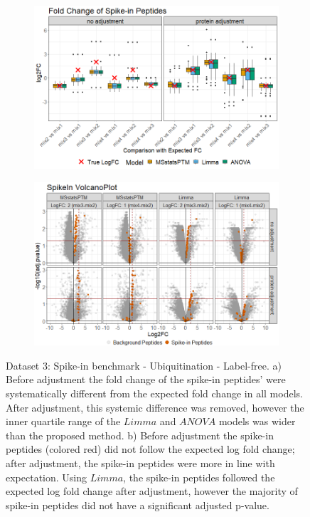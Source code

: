\documentclass[mcp]{article}
\numberwithin{table}{section}
\begin{document}
\begin{figure}[ht]
\centering
\begin{subfigure}[c]{0.825\linewidth}
\includegraphics[width=1\textwidth]{images/spike_in_fc.png}
\caption{}
\label{fig:spikein_boxplot}
\end{subfigure}
\begin{subfigure}[c]{0.825\linewidth}
\includegraphics[width=1\textwidth]{images/spike_in_volcano.png}
\caption{}
\label{fig:spikein_prop_volcano}
\end{subfigure}
\caption{Dataset 3: Spike-in benchmark - Ubiquitination - Label-free. a) Before adjustment the fold change of the spike-in peptides' were systematically different from the expected fold change in all models. After adjustment, this systemic difference was removed, however the inner quartile range of the $Limma$ and $ANOVA$ models was wider than the proposed method. b) Before adjustment the spike-in peptides (colored red) did not follow the expected log fold change; after adjustment, the spike-in peptides were more in line with expectation. Using $Limma$, the spike-in peptides followed the expected log fold change after adjustment, however the majority of spike-in peptides did not have a significant adjusted p-value.}
\label{fig:spikein_volcano}
\end{figure}
\end{document}
